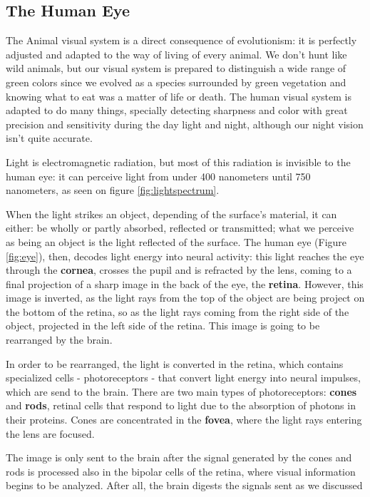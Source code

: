 \subsection{The Human Eye}
\label{sec:humaneye}
%
The Animal visual system is a direct consequence of evolutionism: it is perfectly adjusted and adapted
to the way of living of every animal. We don’t hunt like wild animals, but our visual system is
prepared to distinguish a wide range of green colors since we evolved as a species surrounded by green
vegetation and knowing what to eat was a matter of life or death. The human visual system is adapted
to do many things, specially detecting sharpness and color with great precision and sensitivity during
the day light and night, although our night vision isn’t quite accurate. \par
%
Light is electromagnetic radiation, but most of this radiation is invisible to the human eye: it can
perceive light from under 400 nanometers until 750 nanometers, as seen on figure \ref{fig:lightspectrum}. \par
When the light strikes an object, depending of the surface’s material, it can either: be wholly or partly
absorbed, reflected or transmitted; what we perceive as being an object is the light reflected of the
surface. The human eye (Figure \ref{fig:eye}), then, decodes light energy into neural activity:
this light reaches the eye through the \textbf{cornea}, crosses the pupil and is refracted by the lens, coming to a final
projection of a sharp image in the back of the eye, the \textbf{retina}. However, this image is
inverted, as the light rays from the top of the object are being project on the bottom of the retina,
so as the light rays coming from the right side of the object, projected in the left side of the
retina. This image is going to be rearranged by the brain.  \par
%
In order to be rearranged, the light is converted in the retina, which contains specialized cells
- photoreceptors - that convert light energy into neural impulses,
which are send to the brain. There are two main types of photoreceptors: \textbf{cones} and
\textbf{rods},
retinal cells that respond to light due to the absorption of photons in their proteins. Cones are concentrated in the \textbf{fovea}, where the light rays
entering the lens are focused. \par
The image is only sent to the brain after the signal generated by the cones and rods is processed also
in the bipolar cells of the retina, where visual information begins to be analyzed. After all, the brain digests the signals sent as we discussed
